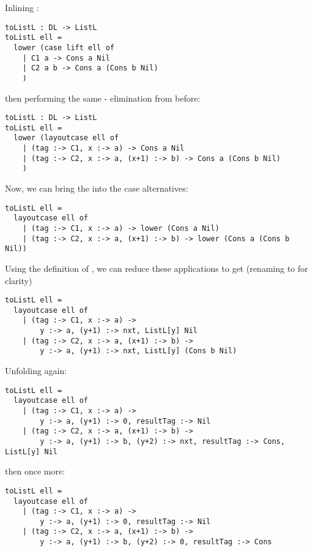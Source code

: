\documentclass[10pt]{article}
\begin{document}
\noindent
Inlining :

\begin{lstlisting}
toListL : DL -> ListL
toListL ell =
  lower (case lift ell of
    | C1 a -> Cons a Nil
    | C2 a b -> Cons a (Cons b Nil)
    )
\end{lstlisting}

\noindent
then performing the same - elimination from before:

\begin{lstlisting}
toListL : DL -> ListL
toListL ell =
  lower (layoutcase ell of
    | (tag :-> C1, x :-> a) -> Cons a Nil
    | (tag :-> C2, x :-> a, (x+1) :-> b) -> Cons a (Cons b Nil)
    )
\end{lstlisting}

\noindent
Now, we can bring the  into the case alternatives:

\begin{lstlisting}
toListL ell =
  layoutcase ell of
    | (tag :-> C1, x :-> a) -> lower (Cons a Nil)
    | (tag :-> C2, x :-> a, (x+1) :-> b) -> lower (Cons a (Cons b Nil))
\end{lstlisting}

\noindent
Using the definition of , we can reduce these  applications to get (renaming  to  for clarity)

\begin{lstlisting}
toListL ell =
  layoutcase ell of
    | (tag :-> C1, x :-> a) ->
        y :-> a, (y+1) :-> nxt, ListL[y] Nil
    | (tag :-> C2, x :-> a, (x+1) :-> b) ->
        y :-> a, (y+1) :-> nxt, ListL[y] (Cons b Nil)
\end{lstlisting}

\noindent
Unfolding  again:

\begin{lstlisting}
toListL ell =
  layoutcase ell of
    | (tag :-> C1, x :-> a) ->
        y :-> a, (y+1) :-> 0, resultTag :-> Nil
    | (tag :-> C2, x :-> a, (x+1) :-> b) ->
        y :-> a, (y+1) :-> b, (y+2) :-> nxt, resultTag :-> Cons, ListL[y] Nil
\end{lstlisting}

\noindent
then once more:

\begin{lstlisting}
toListL ell =
  layoutcase ell of
    | (tag :-> C1, x :-> a) ->
        y :-> a, (y+1) :-> 0, resultTag :-> Nil
    | (tag :-> C2, x :-> a, (x+1) :-> b) ->
        y :-> a, (y+1) :-> b, (y+2) :-> 0, resultTag :-> Cons
\end{lstlisting}
\end{document}
